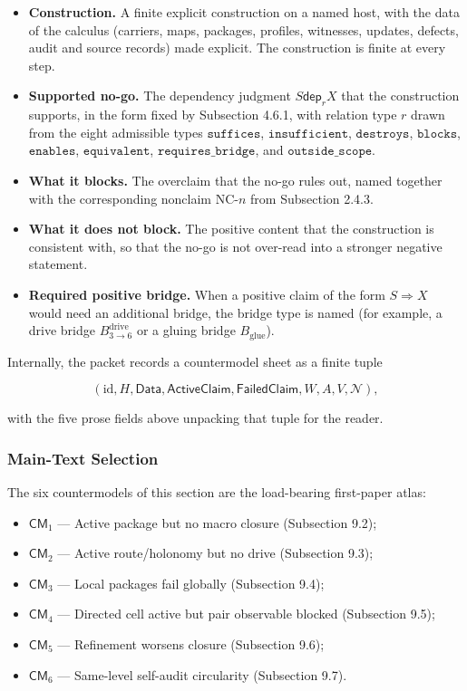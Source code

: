 \documentclass[11pt]{article}
\providecommand{\tightlist}{}
\theoremstyle{definition}
\begin{document}
\begin{itemize}
\tightlist
\item
  \textbf{Construction.} A finite explicit construction on a named host, with the data of the calculus (carriers, maps, packages, profiles, witnesses, updates, defects, audit and source records) made explicit. The construction is finite at every step.
\item
  \textbf{Supported no-go.} The dependency judgment \(S\mathrel{\mathsf{dep}_r}X\) that the construction supports, in the form fixed by Subsection 4.6.1, with relation type \(r\) drawn from the eight admissible types \(\texttt{suffices}\), \(\texttt{insufficient}\), \(\texttt{destroys}\), \(\texttt{blocks}\), \(\texttt{enables}\), \(\texttt{equivalent}\), \(\texttt{requires\_bridge}\), and \(\texttt{outside\_scope}\).
\item
  \textbf{What it blocks.} The overclaim that the no-go rules out, named together with the corresponding nonclaim NC-\(n\) from Subsection 2.4.3.
\item
  \textbf{What it does not block.} The positive content that the construction is consistent with, so that the no-go is not over-read into a stronger negative statement.
\item
  \textbf{Required positive bridge.} When a positive claim of the form \(S\Rightarrow X\) would need an additional bridge, the bridge type is named (for example, a drive bridge \(B_{3\to 6}^{\mathrm{drive}}\) or a gluing bridge \(B_{\mathrm{glue}}\)).
\end{itemize}

Internally, the packet records a countermodel sheet as a finite tuple

\[
(\mathrm{id},H,\mathsf{Data},\mathsf{ActiveClaim},\mathsf{FailedClaim},W,A,V,\mathcal N),
\]

with the five prose fields above unpacking that tuple for the reader.

\subsubsection{Main-Text Selection}

The six countermodels of this section are the load-bearing first-paper atlas:

\begin{itemize}
\tightlist
\item
  \(\mathsf{CM}_1\) --- Active package but no macro closure (Subsection 9.2);
\item
  \(\mathsf{CM}_2\) --- Active route/holonomy but no drive (Subsection 9.3);
\item
  \(\mathsf{CM}_3\) --- Local packages fail globally (Subsection 9.4);
\item
  \(\mathsf{CM}_4\) --- Directed cell active but pair observable blocked (Subsection 9.5);
\item
  \(\mathsf{CM}_5\) --- Refinement worsens closure (Subsection 9.6);
\item
  \(\mathsf{CM}_6\) --- Same-level self-audit circularity (Subsection 9.7).
\end{itemize}
\end{document}
